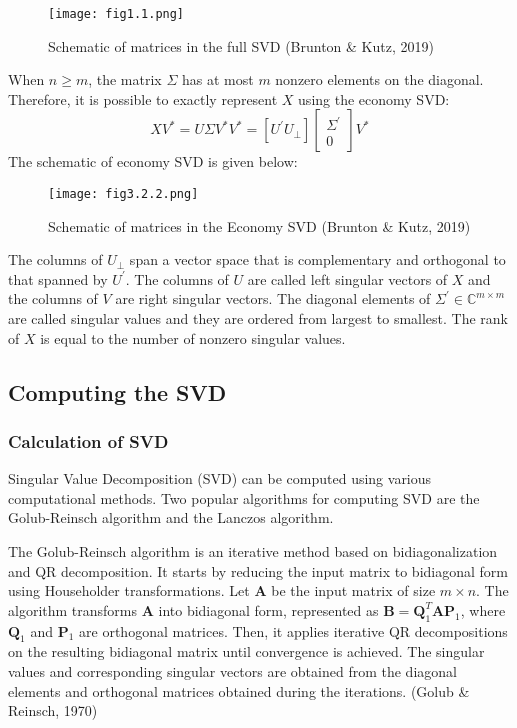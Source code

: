 \documentclass[a4paper]{article}
\begin{document}
{		\begin{figure}[H]
			\centering
			\texttt{[image: fig1.1.png]}
			\caption[Caption for the list of figures]{Schematic of matrices in the full SVD (Brunton \& Kutz, 2019)\protect}
			\label{fig:example}
		\end{figure}
		
		When $n \geq m$, the matrix $\Sigma$ has at most $m$ nonzero elements on the diagonal. Therefore, it is possible to exactly represent $X$ using the economy SVD:
		\[ X V^{*} = U \Sigma V^{*} V^{*} = [U^{'} U_{\perp}] 
		\begin{bmatrix}
			\Sigma^{'} \\
			0
		\end{bmatrix}
		V^{*}
		\]
		The schematic of economy SVD is given below:
		\begin{figure}[h!]
			\centering
			\texttt{[image: fig3.2.2.png]}
			\caption[MATLAB output for the previous command line]{Schematic of matrices in the Economy SVD (Brunton \& Kutz, 2019)\protect}
			\label{fig:example}
		\end{figure}
		
		The columns of $U_{\perp}$ span a vector space that is complementary and orthogonal to that spanned by $U^{'}$. The columns of $U$ are called left singular vectors of $X$ and the columns of $V$ are right singular vectors. The diagonal elements of $\Sigma^{'} \in \mathbb{C}^{m \times m}$ are called singular values and they are ordered from largest to smallest. The rank of $X$ is equal to the number of nonzero singular values.
		
		
		\newpage
		\subsection{Computing the SVD}
		
		\subsubsection{Calculation of SVD}
		
		Singular Value Decomposition (SVD) can be computed using various computational methods. Two popular algorithms for computing SVD are the Golub-Reinsch algorithm and the Lanczos algorithm.
		
		The Golub-Reinsch algorithm is an iterative method based on bidiagonalization and QR decomposition. It starts by reducing the input matrix to bidiagonal form using Householder transformations. Let $\mathbf{A}$ be the input matrix of size $m \times n$. The algorithm transforms $\mathbf{A}$ into bidiagonal form, represented as $\mathbf{B} = \mathbf{Q}_1^T \mathbf{A} \mathbf{P}_1$, where $\mathbf{Q}_1$ and $\mathbf{P}_1$ are orthogonal matrices. Then, it applies iterative QR decompositions on the resulting bidiagonal matrix until convergence is achieved. The singular values and corresponding singular vectors are obtained from the diagonal elements and orthogonal matrices obtained during the iterations. (Golub \& Reinsch, 1970)
		
}
\end{document}
